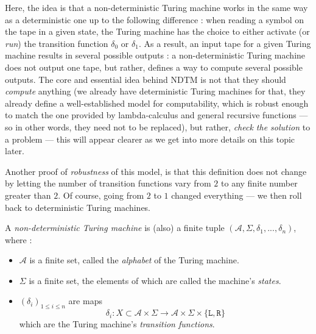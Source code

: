 Here, the idea is that a non-deterministic Turing machine works in the same way as a deterministic one up to the following difference : when reading a symbol on the tape in a given state, the Turing machine has the choice to either \og activate \fg (or \textit{run}) the transition function $ \delta_0 $ or $ \delta_1 $. As a result, an input tape for a given Turing machine results in several possible outputs : a non-deterministic Turing machine does not output one tape, but rather, defines a way to compute several possible outputs. The core and essential idea behind NDTM is not that they should \textit{compute} anything (we already have deterministic Turing machines for that, they already define a well-established model for computability, which is robust enough to match the one provided by lambda-calculus and general recursive functions --- so in other words, they need not to be replaced), but rather, \textit{check the solution} to a problem --- this will appear clearer as we get into more details on this topic later.

Another proof of \textit{robustness} of this model, is that this definition does not change by letting the number of transition functions vary from $ 2 $ to any finite number greater than $ 2 $. Of course, going from $ 2 $ to $ 1 $ changed everything --- we then roll back to deterministic Turing machines.

\begin{definition}
    A \textit{non-deterministic Turing machine} is (also) a finite tuple \( (\mathcal A, \Sigma, \delta_1, ..., \delta_n ) \), where :
    \begin{itemize}
        \item $ \mathcal A $ is a finite set, called the \textit{alphabet} of the Turing machine.
        \item $ \Sigma $ is a finite set, the elements of which are called the machine's \textit{states}.
        \item $ (\delta_i)_{1 \leq i \leq n} $ are maps
        \[
        \delta_i : X \subset \mathcal A \times \Sigma \to \mathcal A \times \Sigma \times \{ \texttt{L}, \texttt{R}\}
        \]
        which are the Turing machine's \textit{transition functions}.
    \end{itemize}
\end{definition}

